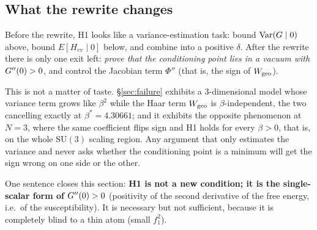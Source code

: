 \subsection{What the rewrite changes}

Before the rewrite, H1 looks like a variance-estimation task: bound $\operatorname{Var}(G\mid 0)$ above, bound
$E[H_{vv}\mid 0]$ below, and combine into a positive $\delta$. After the rewrite there is only one
exit left: \emph{prove that the conditioning point lies in a vacuum with $G''(0)>0$}, and control the
Jacobian term $\Phi''$ (that is, the sign of $W_{\mathrm{geo}}$).

This is not a matter of taste. \S\ref{sec:failure} exhibits a 3-dimensional model whose variance
term grows like $\beta^{2}$ while the Haar term $W_{\mathrm{geo}}$ is $\beta$-independent, the two cancelling
exactly at $\beta^{*}=4.30661$; and it exhibits the opposite phenomenon at $N=3$, where the same
coefficient flips sign and H1 holds for every $\beta>0$, that is, on the whole $\mathrm{SU}(3)$ scaling
region. Any argument that only estimates the
variance and never asks whether the conditioning point is a minimum will get the sign wrong on one
side or the other. \LN
{}

\noindent
One sentence closes this section: \textbf{H1 is not a new condition; it is the single-scalar form of
$G''(0)>0$} (positivity of the second derivative of the free energy, i.e.\ of the susceptibility). It
is necessary but not sufficient, because it is completely blind to a thin atom (small $f_1^{2}$). \LT
{}
